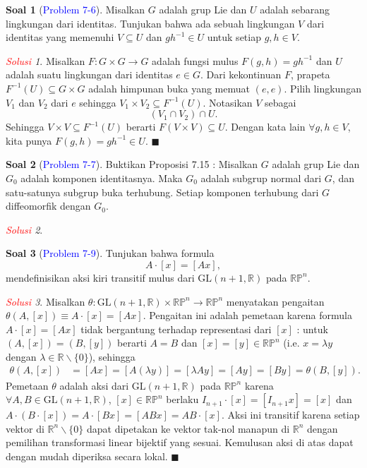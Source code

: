 \documentclass[11pt]{article}
\theoremstyle{definition}
\newtheorem*{problem}{Soal}
\theoremstyle{remark}
\newtheorem*{solution}{\textcolor{red}{Solusi}}
\newcommand{\er}{\mathbb{R}}            %
\newcommand{\Rn}{\mathbb{R}^n}          %
\newcommand{\GL}{\text{GL}}                 %
\newcommand{\rp}{\mathbb{RP}}               %
\begin{document}
\begin{problem}[\textcolor{blue}{Problem 7-6}]
Misalkan $G$ adalah grup Lie dan $U$ adalah sebarang lingkungan dari identitas. Tunjukan bahwa ada sebuah lingkungan $V$ dari identitas  yang memenuhi $V \subseteq U$ dan $gh^{-1} \in U$ untuk setiap $g,h \in V$. 
\end{problem}
\begin{solution}
Misalkan $F : G \times G \to G$ adalah fungsi mulus $F(g,h)=gh^{-1}$ dan $U$ adalah suatu lingkungan dari identitas $e \in G$. Dari kekontinuan $F$, prapeta $F^{-1}(U) \subseteq G \times G$ adalah himpunan buka yang memuat $(e,e)$. Pilih lingkungan $V_1$ dan $V_2$ dari $e$ sehingga $V_1 \times V_2 \subseteq F^{-1}(U)$. Notasikan $V$ sebagai 
$$
(V_1 \cap V_2) \cap U.
$$
Sehingga $V \times V \subseteq F^{-1}(U)$ berarti $F(V \times V) \subseteq U$. Dengan kata lain $\forall g,h \in V$, kita punya $F(g,h)=gh^{-1} \in U$. $\blacksquare$
\end{solution}

\begin{problem}[\textcolor{blue}{Problem 7-7}]
Buktikan Proposisi 7.15 : Misalkan $G$ adalah grup Lie dan $G_0$ adalah komponen identitasnya. Maka $G_0$ adalah subgrup normal dari $G$, dan satu-satunya subgrup buka terhubung. Setiap komponen terhubung dari $G$ diffeomorfik dengan $G_0$.
\end{problem}
\begin{solution}

\end{solution}

\begin{problem}[\textcolor{blue}{Problem 7-9}]
Tunjukan bahwa formula 
$$
A \cdot [x] = [Ax],
$$
mendefinisikan aksi kiri transitif mulus dari $\text{GL}(n+1,\er)$ pada $\er \mathbb{P}^n$.
\end{problem}
\begin{solution}
Misalkan $\theta : \GL(n+1,\er) \times \rp^n \to \rp^n$ menyatakan pengaitan $\theta(A,[x]) \equiv  A \cdot [x] = [Ax]$. Pengaitan ini adalah pemetaan karena formula $A \cdot [x] = [Ax]$ tidak bergantung terhadap representasi dari $[x]$ : untuk $(A,[x]) = (B,[y])$ berarti $A=B$ dan $[x] = [y] \in \rp^n$ (i.e. $x=\lambda y$ dengan $\lambda \in \er\smallsetminus \{0\}$), sehingga
\begin{align*}
    \theta (A,[x]) &= [Ax] = [A(\lambda y)] = [\lambda Ay] = [Ay] = [By] = \theta(B,[y]).
\end{align*}
Pemetaan $\theta$ adalah aksi dari $\GL(n+1,\er)$ pada $\rp^n$ karena $\forall A,B \in \GL(n+1,\er)$, $[x] \in \rp^n$ berlaku $I_{n+1} \cdot [x] = [I_{n+1}x] = [x]$ dan $A \cdot (B \cdot [x]) = A \cdot [Bx] = [ABx] = AB \cdot [x]$. Aksi ini transitif karena setiap vektor di $\Rn\smallsetminus \{0\}$ dapat dipetakan ke vektor tak-nol manapun di $\Rn$ dengan pemilihan transformasi linear bijektif yang sesuai. Kemulusan aksi di atas dapat dengan mudah diperiksa secara lokal. $\blacksquare$  

\end{solution}
\end{document}
